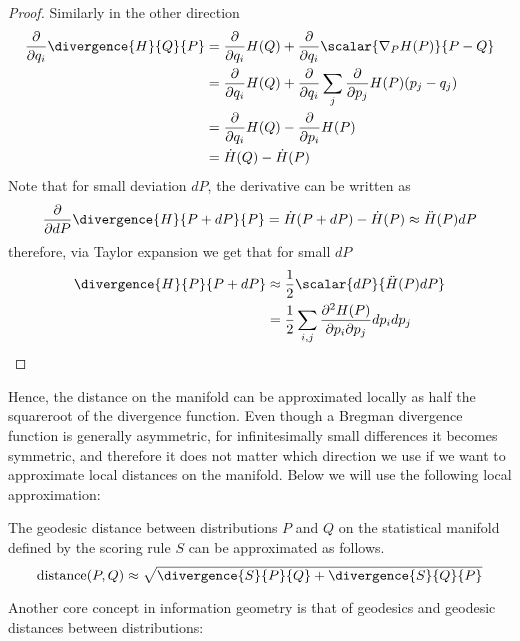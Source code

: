 \begin{statement}
\begin{proof}
	Similarly in the other direction
		\begin{align}
				\frac{\partial}{\partial q_i} \divergence{H}{Q}{P} &=  \frac{\partial}{\partial q_i} H(Q) + 	\frac{\partial}{\partial q_i}\scalar{\nabla_{P} H(P)}{P - Q}\\
					&=  \frac{\partial}{\partial q_i} H(Q) + \frac{\partial}{\partial q_i}\sum_{j} \frac{\partial}{\partial p_j} H(P) (p_j - q_j)\\
					&=  \frac{\partial}{\partial q_i} H(Q)  - \frac{\partial}{\partial p_i} H(P)\\
					&= \dot{H}(Q) - \dot{H}(P)
		\end{align}
		Note that for small deviation $dP$, the derivative can be written as
		\begin{align}
			\frac{\partial}{\partial dP} \divergence{H}{P+dP}{P} = \dot{H}(P+dP) - \dot{H}(P) \approx  \ddot{H}(P) dP
		\end{align}
		therefore, via Taylor expansion we get that for small $dP$
		\begin{align}
			\divergence{H}{P}{P+dP} &\approx \frac{1}{2} \scalar{dP}{\ddot{H}(P)dP}\\
				&= \frac{1}{2} \sum_{i,j} \frac{\partial^2 H(P)}{\partial p_i\partial p_j} dp_{i} dp_j
		\end{align}
\end{proof}
\end{statement}

Hence, the distance on the manifold can be approximated locally as half the squareroot of the divergence function. Even though a Bregman divergence function is generally asymmetric, for infinitesimally small differences it becomes symmetric, and therefore it does not matter which direction we use if we want to approximate local distances on the manifold. Below we will use the following local approximation:

\begin{corollary}
	The geodesic distance between distributions $P$ and $Q$ on the statistical manifold defined by the scoring rule $S$ can be approximated as follows.
	\begin{equation}
		\mbox{distance}(P,Q) \approx \sqrt{\divergence{S}{P}{Q} + \divergence{S}{Q}{P}} \label{eqn:local_approximation}
	\end{equation}
\end{corollary}

Another core concept in information geometry is that of geodesics and geodesic distances between distributions:


